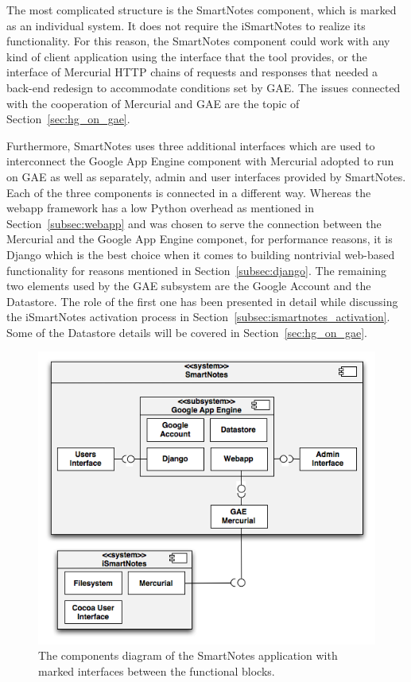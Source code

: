 The most complicated structure is the SmartNotes component, which is marked as an individual system. It does not require the iSmartNotes to realize its functionality. For this reason, the SmartNotes component could work with any kind of client application using the interface that the tool provides, or the interface of Mercurial HTTP chains of requests and responses that needed a back-end redesign to accommodate conditions set by GAE. The issues connected with the cooperation of Mercurial and GAE are the topic of Section~\ref{sec:hg_on_gae}. 

Furthermore, SmartNotes uses three additional interfaces which are used to interconnect the Google App Engine component with Mercurial adopted to run on GAE as well as separately, admin and user interfaces provided by SmartNotes. Each of the three components is connected in a different way. Whereas the webapp framework has a low Python overhead as mentioned in Section~\ref{subsec:webapp} and was chosen to serve the connection between the Mercurial and the Google App Engine componet, for performance reasons, it is Django which is the best choice when it comes to building nontrivial web-based functionality for reasons mentioned in Section~\ref{subsec:django}. The remaining two elements used by the GAE subsystem are the Google Account and the Datastore. The role of the first one has been presented in detail while discussing the iSmartNotes activation process in Section~\ref{subsec:ismartnotes_activation}. Some of the Datastore details will be covered in Section~\ref{sec:hg_on_gae}. 
\begin{figure}[ht]
\begin{center}
\includegraphics[scale=0.6]{charts/smartnotes_componets.png}
\caption{The components diagram of the SmartNotes application with marked interfaces between the functional blocks.}
\label{fig:smartnotes_components}
\end{center}
\end{figure}

